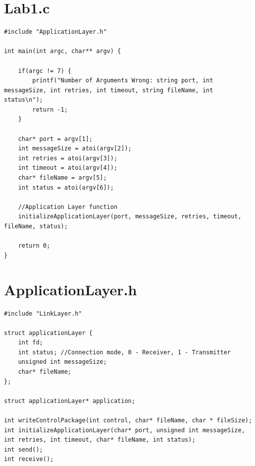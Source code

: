 \documentclass[a4paper]{article}
\begin{document}
\section{Lab1.c}
\begin{lstlisting}
#include "ApplicationLayer.h"

int main(int argc, char** argv) {

    if(argc != 7) {
        printf("Number of Arguments Wrong: string port, int messageSize, int retries, int timeout, string fileName, int status\n");
        return -1;
    }
	
    char* port = argv[1];
    int messageSize = atoi(argv[2]);
    int retries = atoi(argv[3]);
    int timeout = atoi(argv[4]);
    char* fileName = argv[5];
    int status = atoi(argv[6]);

    //Application Layer function
    initializeApplicationLayer(port, messageSize, retries, timeout, fileName, status);

    return 0;
}
\end{lstlisting}
\newpage

\section{ApplicationLayer.h}
\begin{lstlisting}
#include "LinkLayer.h"

struct applicationLayer {
    int fd;
    int status; //Connection mode, 0 - Receiver, 1 - Transmitter
    unsigned int messageSize;
    char* fileName;
};

struct applicationLayer* application;

int writeControlPackage(int control, char* fileName, char * fileSize);
int initializeApplicationLayer(char* port, unsigned int messageSize, int retries, int timeout, char* fileName, int status);
int send();
int receive();
\end{lstlisting}
\newpage
\end{document}
